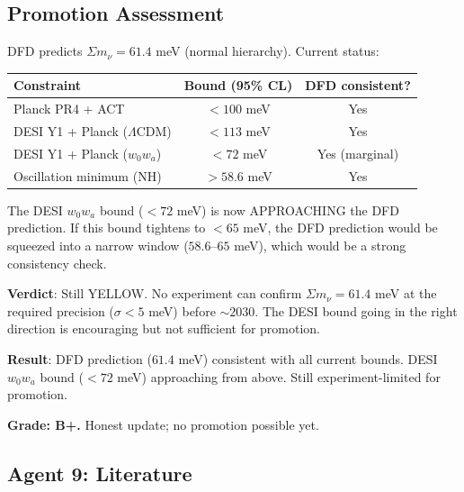 \documentclass[11pt,a4paper]{article}
\begin{document}
\subsection{Promotion Assessment}

DFD predicts $\Sigma m_\nu = 61.4$ meV (normal hierarchy). Current status:

\begin{center}
\begin{tabular}{lcc}
\toprule
\textbf{Constraint} & \textbf{Bound (95\% CL)} & \textbf{DFD consistent?} \\
\midrule
Planck PR4 + ACT & $< 100$ meV & Yes \\
DESI Y1 + Planck ($\Lambda$CDM) & $< 113$ meV & Yes \\
DESI Y1 + Planck ($w_0 w_a$) & $< 72$ meV & Yes (marginal) \\
Oscillation minimum (NH) & $> 58.6$ meV & Yes \\
\bottomrule
\end{tabular}
\end{center}

The DESI $w_0 w_a$ bound ($< 72$ meV) is now APPROACHING the DFD prediction. If this bound tightens to $< 65$ meV, the DFD prediction would be squeezed into a narrow window ($58.6$--$65$ meV), which would be a strong consistency check.

\textbf{Verdict}: Still YELLOW. No experiment can confirm $\Sigma m_\nu = 61.4$ meV at the required precision ($\sigma < 5$ meV) before $\sim 2030$. The DESI bound going in the right direction is encouraging but not sufficient for promotion.

\begin{tcolorbox}[colback=yellow!5!white, colframe=yellow!60!black, title={Agent 9: $\Sigma m_\nu$ --- Remains YELLOW}]
\textbf{Result}: DFD prediction ($61.4$ meV) consistent with all current bounds. DESI $w_0w_a$ bound ($< 72$ meV) approaching from above. Still experiment-limited for promotion.

\textbf{Grade: B+.} Honest update; no promotion possible yet.
\end{tcolorbox}

\subsection{Agent 9: Literature}
\end{document}
